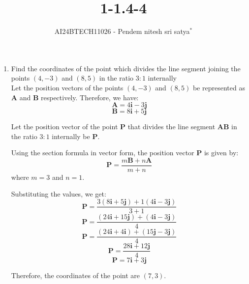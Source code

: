 \documentclass[journal]{IEEEtran}
\begin{document}

\vspace{3cm}


\title{1-1.4-4}
\author{AI24BTECH11026 - Pendem nitesh sri satya$^{*}$%
}
\maketitle
\begin{enumerate}
    \item Find the coordinates of the point which divides the line segment joining the points $(4,-3)$ and $(8,5)$ in the ratio $3:1$ internally\\
\solution
Let the position vectors of the points \((4, -3)\) and \((8, 5)\) be represented as \(\mathbf{A}\) and \(\mathbf{B}\) respectively. Therefore, we have:
\[
\mathbf{A} = 4\mathbf{i} - 3\mathbf{j}
\]
\[
\mathbf{B} = 8\mathbf{i} + 5\mathbf{j}
\]

Let the position vector of the point \(\mathbf{P}\) that divides the line segment \(\mathbf{AB}\) in the ratio \(3:1\) internally be \(\mathbf{P}\).

Using the section formula in vector form, the position vector \(\mathbf{P}\) is given by:
\[
\mathbf{P} = \frac{m\mathbf{B} + n\mathbf{A}}{m+n}
\]
where \(m = 3\) and \(n = 1\).

Substituting the values, we get:
\[
\mathbf{P} = \frac{3(8\mathbf{i} + 5\mathbf{j}) + 1(4\mathbf{i} - 3\mathbf{j})}{3+1}
\]
\[
\mathbf{P} = \frac{(24\mathbf{i} + 15\mathbf{j}) + (4\mathbf{i} - 3\mathbf{j})}{4}
\]
\[
\mathbf{P} = \frac{(24\mathbf{i} + 4\mathbf{i}) + (15\mathbf{j} - 3\mathbf{j})}{4}
\]
\[
\mathbf{P} = \frac{28\mathbf{i} + 12\mathbf{j}}{4}
\]
\[
\mathbf{P} = 7\mathbf{i} + 3\mathbf{j}
\]

Therefore, the coordinates of the point are \((7, 3)\).
\end{enumerate}
\end{document}
